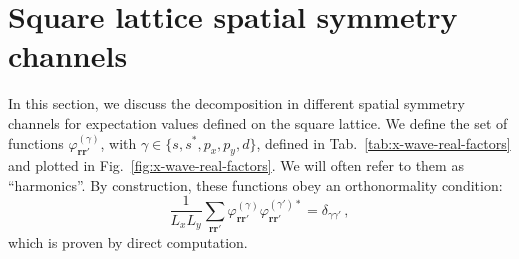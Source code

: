 \section{Square lattice spatial symmetry channels}\label{sec:square-lattice-symmetries}

In this section, we discuss the decomposition in different spatial symmetry channels for expectation values defined on the square lattice. We define the set of functions $\varphi_{\mathbf{r}\mathbf{r}'}^{(\gamma)}$, with $\gamma \in \lbrace s,s^*,p_x,p_y, d \rbrace$, defined in Tab.~\ref{tab:x-wave-real-factors} and plotted in Fig.~\ref{fig:x-wave-real-factors}. We will often refer to them as ``harmonics''. By construction, these functions obey an orthonormality condition:
\begin{equation}\label{eq:vphi-ortho}
	\frac{1}{L_x L_y} \sum_{\mathbf{r}\mathbf{r}'} \varphi_{\mathbf{r}\mathbf{r}'}^{(\gamma)} \varphi_{\mathbf{r}\mathbf{r}'}^{(\gamma')*} = \delta_{\gamma\gamma'} \, ,
\end{equation}
which is proven by direct computation.

